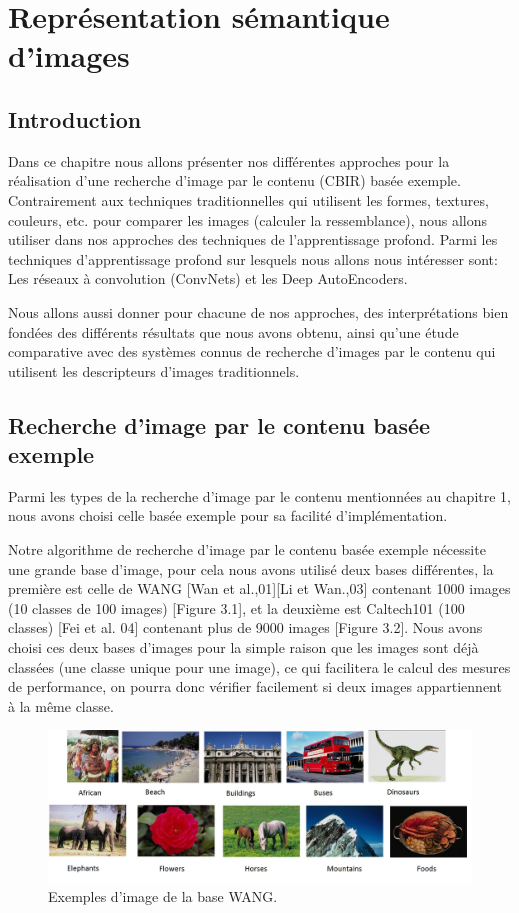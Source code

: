 
\chapter{Représentation sémantique d'images} %

\section{Introduction}
	Dans ce chapitre nous allons présenter nos différentes approches pour la réalisation d'une recherche d'image par le contenu (CBIR) basée exemple. Contrairement aux techniques traditionnelles qui utilisent les formes, textures, couleurs, etc. pour comparer les images (calculer la ressemblance), nous allons utiliser dans nos approches des techniques de l'apprentissage profond. Parmi les techniques d'apprentissage profond sur lesquels nous allons nous intéresser sont: Les réseaux à convolution (ConvNets) et les Deep AutoEncoders. 
	
	Nous allons aussi donner pour chacune de nos approches, des interprétations bien fondées des différents résultats que nous avons obtenu, ainsi qu'une étude comparative avec des systèmes connus de recherche d'images par le contenu qui utilisent les descripteurs d'images traditionnels.
	


\section{Recherche d'image par le contenu basée exemple}
	Parmi les types de la recherche d'image par le contenu mentionnées au chapitre 1, nous avons choisi celle basée exemple pour sa facilité d'implémentation.
	
	Notre algorithme de recherche d'image par le contenu basée exemple nécessite une grande base d'image, pour cela nous avons utilisé deux bases différentes, la première est celle de WANG [Wan et al.,01][Li et Wan.,03] contenant 1000 images (10 classes de 100 images) [Figure 3.1], et la deuxième est Caltech101 (100 classes) [Fei et al. 04] contenant plus de 9000 images [Figure 3.2]. Nous avons choisi ces deux bases d'images pour la simple raison que les images sont déjà classées (une classe unique pour une image), ce qui facilitera le calcul des mesures de performance, on pourra donc vérifier facilement si deux images appartiennent à la même classe.
	
\begin{figure}[H]
	\centering
		\includegraphics[width=7in]{Figures/wang.jpg}
	\caption[An Electron]{Exemples d'image de la base WANG.}
	\label{fig:Electron}
\end{figure}

